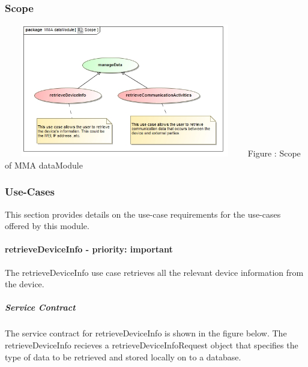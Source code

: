\documentclass[hidelinks, 12pt, oneside]{article}
\begin{document}
	\subsubsection{Scope}
		\includegraphics[width=400px,height=220px]{img/scopeData.jpg}
		Figure : Scope of MMA dataModule	
		
		
	
	\subsubsection{Use-Cases}
		This section provides details on the use-case requirements for the use-cases offered by this module.	
		
	\paragraph{retrieveDeviceInfo - priority: important}
		The retrieveDeviceInfo use case retrieves all the relevant device information from the device.\newline
		
		\subparagraph{Service Contract}
		The service contract for retrieveDeviceInfo is shown in the figure below. The retrieveDeviceInfo recieves a retrieveDeviceInfoRequest object that specifies the type of data to be retrieved and stored locally on to a database.
		
\end{document}
